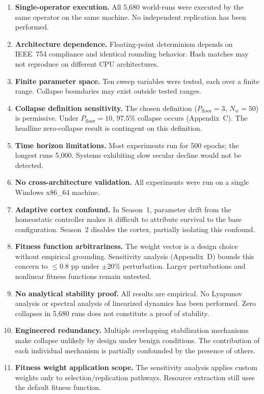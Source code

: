 \documentclass[11pt,a4paper]{article}
\begin{document}
\begin{enumerate}
  \item \textbf{Single-operator execution.} All 5,680 world-runs were executed by the same operator on the same machine. No independent replication has been performed.

  \item \textbf{Architecture dependence.} Floating-point determinism depends on IEEE~754 compliance and identical rounding behavior. Hash matches may not reproduce on different CPU architectures.

  \item \textbf{Finite parameter space.} Ten sweep variables were tested, each over a finite range. Collapse boundaries may exist outside tested ranges.

  \item \textbf{Collapse definition sensitivity.} The chosen definition ($P_{\text{floor}} = 3$, $N_w = 50$) is permissive. Under $P_{\text{floor}} = 10$, 97.5\% collapse occurs (Appendix~C). The headline zero-collapse result is contingent on this definition.

  \item \textbf{Time horizon limitations.} Most experiments run for 500 epochs; the longest runs 5,000. Systems exhibiting slow secular decline would not be detected.

  \item \textbf{No cross-architecture validation.} All experiments were run on a single Windows x86\_64 machine.

  \item \textbf{Adaptive cortex confound.} In Season~1, parameter drift from the homeostatic controller makes it difficult to attribute survival to the base configuration. Season~2 disables the cortex, partially isolating this confound.

  \item \textbf{Fitness function arbitrariness.} The weight vector is a design choice without empirical grounding. Sensitivity analysis (Appendix~D) bounds this concern to $\leq 0.8$ pp under $\pm 20\%$ perturbation. Larger perturbations and nonlinear fitness functions remain untested.

  \item \textbf{No analytical stability proof.} All results are empirical. No Lyapunov analysis or spectral analysis of linearized dynamics has been performed. Zero collapses in 5,680 runs does not constitute a proof of stability.

  \item \textbf{Engineered redundancy.} Multiple overlapping stabilization mechanisms make collapse unlikely by design under benign conditions. The contribution of each individual mechanism is partially confounded by the presence of others.

  \item \textbf{Fitness weight application scope.} The sensitivity analysis applies custom weights only to selection/replication pathways. Resource extraction still uses the default fitness function.
\end{enumerate}
\end{document}
